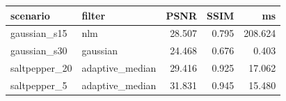 \begin{tabular}{llrrr}
\toprule
scenario & filter & PSNR & SSIM & ms \\
\midrule
gaussian_s15 & nlm & 28.507 & 0.795 & 208.624 \\
gaussian_s30 & gaussian & 24.468 & 0.676 & 0.403 \\
saltpepper_20 & adaptive_median & 29.416 & 0.925 & 17.062 \\
saltpepper_5 & adaptive_median & 31.831 & 0.945 & 15.480 \\
\bottomrule
\end{tabular}
